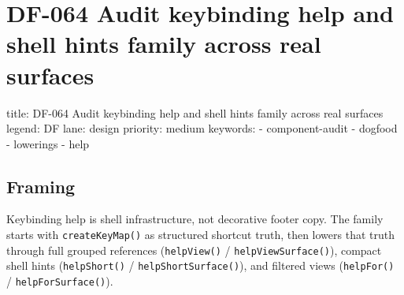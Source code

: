 \chapter{DF-064 Audit keybinding help and shell hints family across real surfaces}\label{record-105}

\smallskip

\begin{RecordMeta}
title: DF-064 Audit keybinding help and shell hints family across real surfaces
legend: DF
lane: design
priority: medium
keywords:
  - component-audit
  - dogfood
  - lowerings
  - help

\end{RecordMeta}

\section{Framing}\label{record-105-framing}

Keybinding help is shell infrastructure, not decorative footer copy. The family starts with \texttt{c\allowbreak{}r\allowbreak{}e\allowbreak{}a\allowbreak{}t\allowbreak{}e\allowbreak{}K\allowbreak{}e\allowbreak{}y\allowbreak{}M\allowbreak{}a\allowbreak{}p\allowbreak{}(\allowbreak{})} as structured shortcut truth, then lowers that truth through full grouped references (\texttt{h\allowbreak{}e\allowbreak{}l\allowbreak{}p\allowbreak{}V\allowbreak{}i\allowbreak{}e\allowbreak{}w\allowbreak{}(\allowbreak{})} / \texttt{h\allowbreak{}e\allowbreak{}l\allowbreak{}p\allowbreak{}V\allowbreak{}i\allowbreak{}e\allowbreak{}w\allowbreak{}S\allowbreak{}u\allowbreak{}r\allowbreak{}f\allowbreak{}a\allowbreak{}c\allowbreak{}e\allowbreak{}(\allowbreak{})}), compact shell hints (\texttt{h\allowbreak{}e\allowbreak{}l\allowbreak{}p\allowbreak{}S\allowbreak{}h\allowbreak{}o\allowbreak{}r\allowbreak{}t\allowbreak{}(\allowbreak{})} / \texttt{h\allowbreak{}e\allowbreak{}l\allowbreak{}p\allowbreak{}S\allowbreak{}h\allowbreak{}o\allowbreak{}r\allowbreak{}t\allowbreak{}S\allowbreak{}u\allowbreak{}r\allowbreak{}f\allowbreak{}a\allowbreak{}c\allowbreak{}e\allowbreak{}(\allowbreak{})}), and filtered views (\texttt{h\allowbreak{}e\allowbreak{}l\allowbreak{}p\allowbreak{}F\allowbreak{}o\allowbreak{}r\allowbreak{}(\allowbreak{})} / \texttt{h\allowbreak{}e\allowbreak{}l\allowbreak{}p\allowbreak{}F\allowbreak{}o\allowbreak{}r\allowbreak{}S\allowbreak{}u\allowbreak{}r\allowbreak{}f\allowbreak{}a\allowbreak{}c\allowbreak{}e\allowbreak{}(\allowbreak{})}).

